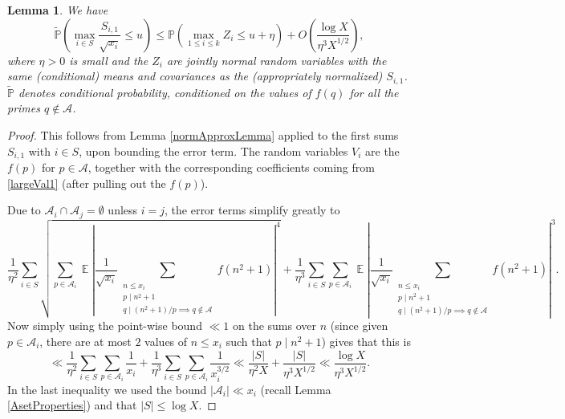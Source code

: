 \documentclass[11pts]{amsart}
\numberwithin{equation}{section}
\newtheorem{lem}{Lemma}[section]
\DeclareMathOperator{\E}{\mathbb{E}}
\begin{document}
\begin{lem}
We have 
\begin{equation}\label{normApprox}
    \widetilde{\mathbb P}\left(\max_{i\in S} \frac{S_{i,1}}{\sqrt{x_i}}\leq u \right)\leq \mathbb P\left(\max_{1\leq i\leq k} Z_i\leq u + \eta\right) + O\left(\frac{\log X}{\eta^3 X^{1/2}}\right), 
\end{equation}
where $\eta>0$ is small and the $Z_i$ are jointly normal random variables with the same (conditional) means and covariances as the (appropriately normalized) $S_{i,1}$. $\widetilde{\mathbb P}$ denotes conditional probability, conditioned on the values of $f(q)$ for all the primes $q\not\in\mathcal A$.  
\end{lem}

\begin{proof} This follows from Lemma \ref{normApproxLemma} applied to the first sums $S_{i,1}$ with $i\in S$, upon bounding the error term. The random variables $V_i$ are the $f(p)$ for $p\in\mathcal A$, together with the corresponding coefficients coming from \eqref{largeVal1} (after pulling out the $f(p)$). 

Due to $\mathcal A_i\cap \mathcal A_j = \emptyset$ unless $i=j$, the error terms simplify greatly to $$\frac{1}{\eta^{2} } \sum_{i\in S} \sqrt{ \sum_{p\in \mathcal A_i}  \E \left\lvert\frac{1}{\sqrt{x_i}} \sum_{\substack{n\leq x_i \\ p\mid n^2 + 1 \\ q\mid (n^2 + 1)/p \implies q\not\in\mathcal A}} f(n^2+1)\right\rvert^{4} }  + \frac{1}{\eta^{3}}
    \sum_{i\in S}
    \sum_{p \in  \mathcal A_i} \E  \left\lvert \frac{1}{\sqrt{
    x_i}} \sum_{\substack{n\leq x_i \\ p\mid n^2 + 1 \\ q\mid (n^2 + 1)/p \implies q\not\in\mathcal A}} f(n^2+1) \right\rvert^{3}.$$ Now simply using the point-wise bound $\ll 1$ on the sums over $n$ (since given $p\in\mathcal A_i$, there are at most $2$ values of $n\leq x_i$ such that $p\mid n^2 + 1$) gives that this is 
    \begin{equation}
        \ll \frac{1}{\eta ^2} \sum_{i\in S}\sum_{p\in\mathcal A_i} \frac{1}{x_i} + \frac{1}{\eta^3}\sum_{i\in S}\sum_{p\in\mathcal A_i} \frac{1}{x_i^{3/2}} \ll \frac{\lvert S\rvert}{\eta^2 X} + \frac{\lvert S\rvert }{\eta^3 X^{1/2}} \ll \frac{\log X}{\eta^3 X^{1/2}}.
    \end{equation}
In the last inequality we used the bound $\lvert \mathcal A_i\rvert\ll x_i$ (recall Lemma \ref{AsetProperties}) and that $\lvert S\rvert\leq\log X$.  
\end{proof}
\end{document}
